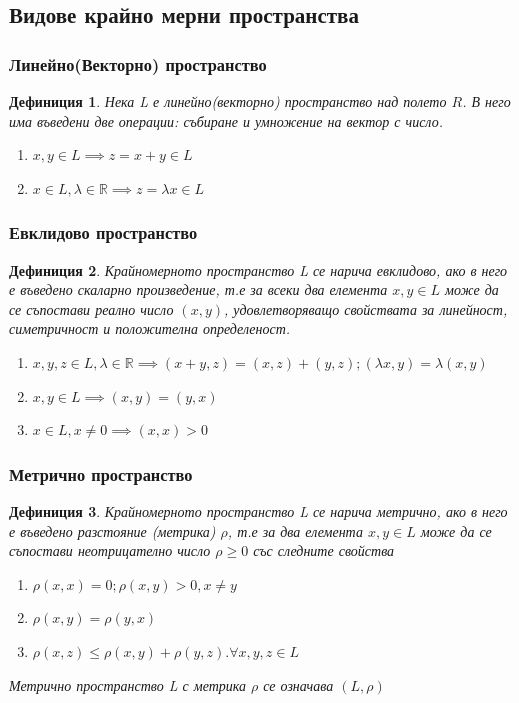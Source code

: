 \documentclass[a4paper,fleqn,12pt]{article}
\newtheorem{definition}{Дефиниция}[subsection]
\theoremstyle{definition}
\begin{document}
\subsection{Видове крайно мерни пространства}

\subsubsection{Линейно(Векторно) пространство}
	\begin{definition}
Нека L е линейно(векторно) пространство над полето $R$. В него има въведени две операции: събиране и умножение на вектор с число.
		\begin{enumerate}
 			\item $x,y \in L \implies z = x+ y \in L $
			\item $x \in L, \lambda \in \mathbb{R} \implies z = \lambda x \in L$
		\end{enumerate}
\end{definition}

\subsubsection{Евклидово пространство}
\begin{definition}
Крайномерното пространство L се нарича евклидово, ако в него е въведено скаларно произведение, т.е за всеки два елемента $x,y \in L$ може да се съпостави реално число $(x,y)$, удовлетворяващо свойствата за линейност, симетричност и положителна определеност.
	\begin{enumerate}
 		\item $x,y,z \in L ,\lambda \in \mathbb{R} \implies (x+y,z) = (x,z) + (y,z); (\lambda x,y) = \lambda(x,y)$
		\item $x,y \in L \implies (x,y) = (y,x)$
		\item $x \in L, x\neq 0 \implies (x,x) > 0 $
	\end{enumerate}
\end{definition}

\subsubsection{Метрично пространство}
\begin{definition}
Крайномерното пространство L се нарича метрично, ако в него е въведено разстояние (метрика) $\rho$, т.е за два елемента $x,y \in L$ може да се съпостави неотрицателно число  $\rho \geq 0 $  със следните свойства
	\begin{enumerate}
 		\item $\rho(x,x) = 0 ; \rho(x,y) > 0 , x\neq y $
		\item $\rho(x,y) = \rho(y,x)$
		\item $\rho(x,z) \leq \rho(x,y) + \rho(y,z). \forall x,y,z \in L$
	\end{enumerate}
Метрично пространство L с метрика $\rho$ се означава $(L,\rho)$
\end{definition}
\end{document}
